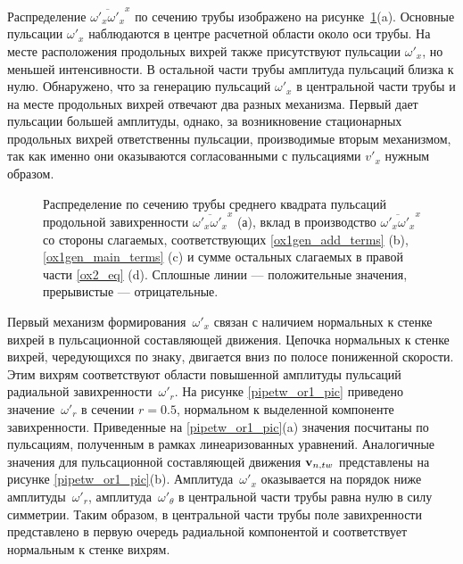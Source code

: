 Распределение $\overline{\omega'_x \omega'_x}^x$ по сечению трубы изображено на рисунке~\ref{ox1gen_pic}(a). Основные пульсации $\omega'_x$ наблюдаются в центре расчетной области около оси трубы. На месте расположения продольных вихрей также присутствуют пульсации $\omega'_x$, но меньшей интенсивности. В остальной части трубы амплитуда пульсаций близка к нулю. Обнаружено, что за генерацию пульсаций $\omega'_x$ в центральной части трубы и на месте продольных вихрей отвечают два разных механизма. Первый дает пульсации большей амплитуды, однако, за возникновение стационарных продольных вихрей ответственны пульсации, производимые вторым механизмом, так как именно они оказываются согласованными с пульсациями $v'_x$ нужным образом.


\begin{figure}
\caption{Распределение по сечению трубы среднего квадрата пульсаций продольной завихренности $\overline{\omega'_x \omega'_x }^x$ (а), вклад в производство $\overline{\omega'_x \omega'_x }^x$ со стороны слагаемых, соответствующих \eqref{ox1gen_add_terms} (b), \eqref{ox1gen_main_terms} (c) и сумме остальных слагаемых в правой части \eqref{ox2_eq} (d). Сплошные линии --- положительные значения, прерывистые --- отрицательные.}
\label{ox1gen_pic}
\end{figure}


Первый механизм формирования~$\omega'_x$ связан с наличием нормальных к стенке вихрей в пульсационной составляющей движения. Цепочка нормальных к стенке вихрей, чередующихся по знаку, двигается вниз по полосе пониженной скорости. Этим вихрям соответствуют области повышенной амплитуды пульсаций радиальной завихренности~$\omega'_r$. На рисунке \ref{pipetw_or1_pic} приведено значение~$\omega'_r$ в сечении $r = 0.5$, нормальном к выделенной компоненте завихренности. Приведенные на \ref{pipetw_or1_pic}(a) значения посчитаны по пульсациям, полученным в рамках линеаризованных уравнений. Аналогичные значения для пульсационной составляющей движения $\mathbf{v}_{n,tw}$ представлены на рисунке \ref{pipetw_or1_pic}(b). Амплитуда~$\omega'_x$ оказывается на порядок ниже амплитуды~$\omega'_r$, амплитуда~$\omega'_\theta$ в центральной части трубы равна нулю в силу симметрии. Таким образом, в центральной части трубы поле завихренности представлено в первую очередь радиальной компонентой и соответствует нормальным к стенке вихрям.

